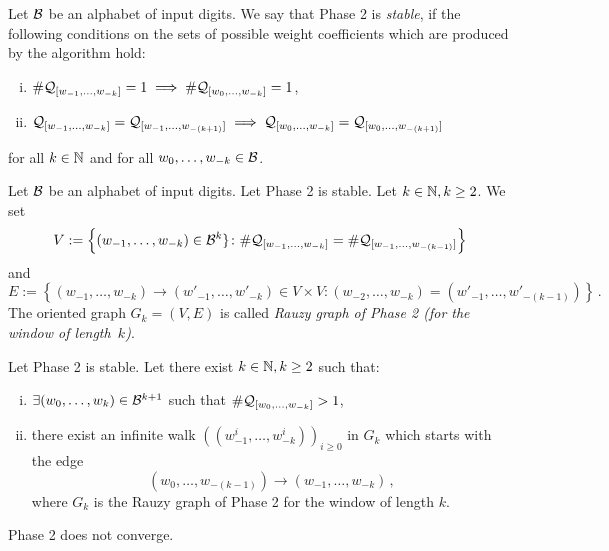 \begin{defn}
Let $\mathcal{B}$ be an alphabet of input digits. We say that Phase 2 is \emph{stable}, if the following conditions on the sets of possible weight coefficients which are produced by the algorithm hold: 
\begin{enumerate}[i)]
	\item $\#\mathcal{Q}_{[w_{-1}, \dots, w_{-k}]}=1 \implies \#\mathcal{Q}_{[w_{0}, \dots, w_{-k}]}=1$,
	\item $\mathcal{Q}_{[w_{-1}, \dots, w_{-k}]}=\mathcal{Q}_{[w_{-1}, \dots, w_{-(k+1)}]} \implies \mathcal{Q}_{[w_{0}, \dots, w_{-k}]}=\mathcal{Q}_{[w_{0}, \dots, w_{-(k+1)}]}$
\end{enumerate}
for all $k\in\mathbb{N}$ and for all $w_0, \dots, w_{-k} \in \mathcal{B}$.
\end{defn}


\begin{defn}
Let $\mathcal{B}$ be an alphabet of input digits. Let Phase 2 is stable. Let $k\in\mathbb{N}, k\geq 2$. We set
$$
V:=\left\{(w_{-1}, \dots, w_{-k})\in\mathcal{B}^k\} \colon \#\mathcal{Q}_{[w_{-1}, \dots, w_{-k}]}=\#\mathcal{Q}_{[w_{-1}, \dots, w_{-(k-1)}]}\right\}
$$
and
$$
E:=\left\{(w_{-1}, \dots, w_{-k})\rightarrow(w'_{-1}, \dots, w'_{-k})\in V\times V \colon (w_{-2}, \dots, w_{-k})=(w'_{-1}, \dots, w'_{-(k-1)})\right\}\,.
$$
The oriented graph $G_k=(V,E)$ is called \emph{Rauzy graph of Phase 2 (for the window of length~$k$)}.
\end{defn}

\begin{thm}
Let Phase 2 is stable. Let there exist $k\in\mathbb{N}, k\geq 2$ such that:
\begin{enumerate}[i)]
	\item $\exists (w_0, \dots, w_{k})\in\mathcal{B}^{k+1}$ such that $\#\mathcal{Q}_{[w_{0}, \dots, w_{-k}]}>1$,
	\item there exist an infinite walk $((w_{-1}^i,\dots, w_{-k}^i))_{i\geq 0}$ in $G_k$ which starts with the edge $$(w_{0}, \dots, w_{-(k-1)})\rightarrow(w_{-1}, \dots, w_{-k})\,,$$ where $G_k$ is the Rauzy graph of Phase 2 for the window of length $k$.
\end{enumerate}
Phase 2 does not converge.
\end{thm}